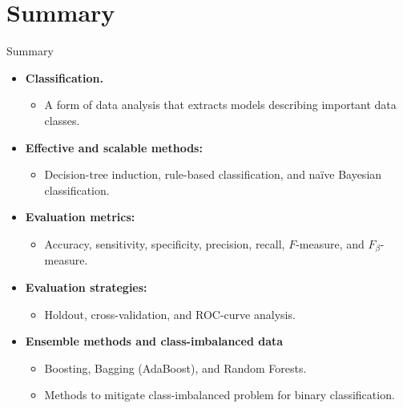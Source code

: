 \section{Summary}

\begin{frame}{Summary}
	\begin{itemize}
		\item \textbf{Classification.}
		      \begin{itemize}
			      \item A form of data analysis that extracts models describing important data classes.
		      \end{itemize}
		\item \textbf{Effective and scalable methods:}
		      \begin{itemize}
			      \item Decision-tree induction, rule-based classification, and naïve Bayesian classification.
		      \end{itemize}
		\item \textbf{Evaluation metrics:}
		      \begin{itemize}
			      \item Accuracy, sensitivity, specificity, precision, recall, $F$-measure, and $F_\beta$-measure.
		      \end{itemize}
		\item \textbf{Evaluation strategies:}
		      \begin{itemize}
			      \item Holdout, cross-validation, and ROC-curve analysis.
		      \end{itemize}
		\item \textbf{Ensemble methods and class-imbalanced data}
		      \begin{itemize}
			      \item Boosting, Bagging (AdaBoost), and Random Forests.
			      \item Methods to mitigate class-imbalanced problem for binary classification.
		      \end{itemize}
	\end{itemize}
\end{frame}
